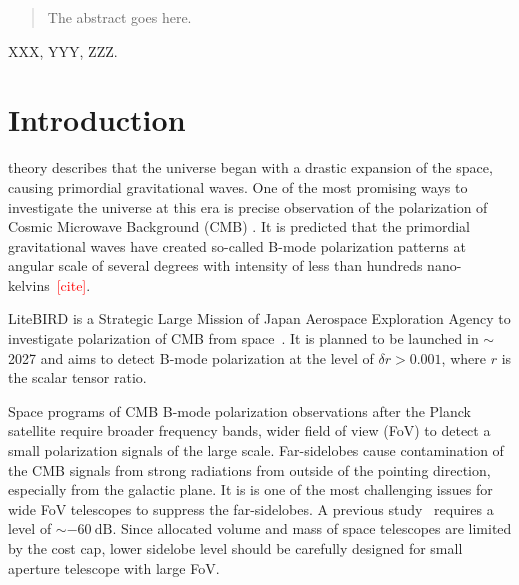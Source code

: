 \documentclass[journal]{IEEEtran}
\newcommand{\red}[1]{\textcolor{red}{#1}}
\begin{document}
\begin{abstract}
The abstract goes here.
\end{abstract}
%
\begin{IEEEkeywords}
XXX, YYY, ZZZ.
\end{IEEEkeywords}
%
%
\IEEEpeerreviewmaketitle
%
%
%
\section{Introduction}
%
% 
% 
% 
% 
%
 theory describes that the universe began with a drastic expansion of the space, causing primordial gravitational waves\cite{Guth1981}. One of the most promising ways to investigate the universe at this era is precise observation of the polarization of Cosmic Microwave Background (CMB) \cite{Kamionkowski1997,Seljak1997}. It is predicted that the primordial gravitational waves have created so-called B-mode polarization patterns at angular scale of several degrees with intensity of less than hundreds nano-kelvins~\red{[cite]}. 
\par
LiteBIRD is a Strategic Large Mission of Japan Aerospace Exploration Agency to investigate polarization of CMB from space~\cite{Hazumi2012, Sekimoto2018}. It is planned to be launched in $\sim$2027 and aims to detect B-mode polarization at the level of $\delta r > 0.001$, where $r$ is the scalar tensor ratio. 
\par
Space programs of CMB B-mode polarization observations after the Planck satellite \cite{Planck2018} require broader frequency bands, wider field of view (FoV) to detect a small polarization signals of the large scale. Far-sidelobes cause contamination of the CMB signals from strong radiations from outside of the pointing direction, especially from the galactic plane. It is is one of the most challenging issues for wide FoV telescopes to suppress the far-sidelobes.  
A previous study~\cite{Tran2010} requires a level of $\sim -60~\mathrm{dB}$.
Since allocated volume and mass of space telescopes are limited by the cost cap, lower sidelobe level should be carefully designed for small aperture telescope with large FoV.
 
\end{document}
